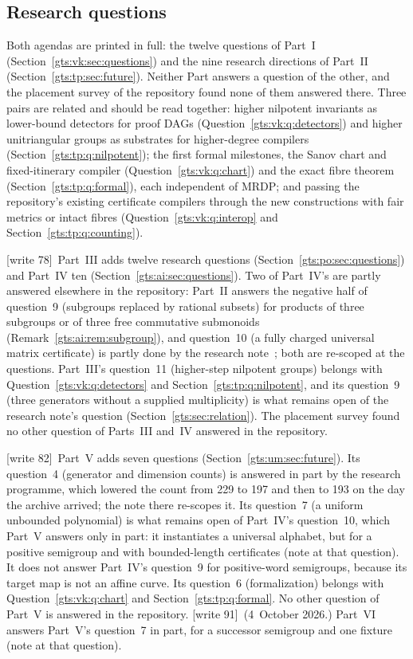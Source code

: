 \documentclass[11pt,letterpaper]{article}
\theoremstyle{definition}
\theoremstyle{remark}
\newcommand{\wtagb}{\textup{[write 78]}}
\newcommand{\wtagc}{\textup{[write 82]}}
\newcommand{\wtagd}{\textup{[write 91]}}
\begin{document}
\subsection{Research questions}\label{gts:sec:questions}

Both agendas are printed in full: the twelve questions of Part~I (Section~\ref{gts:vk:sec:questions}) and the nine research directions of Part~II (Section~\ref{gts:tp:sec:future}). Neither Part answers a question of the other, and the placement survey of the repository found none of them answered there. Three pairs are related and should be read together: higher nilpotent invariants as lower-bound detectors for proof DAGs (Question~\ref{gts:vk:q:detectors}) and higher unitriangular groups as substrates for higher-degree compilers (Section~\ref{gts:tp:q:nilpotent}); the first formal milestones, the Sanov chart and fixed-itinerary compiler (Question~\ref{gts:vk:q:chart}) and the exact fibre theorem (Section~\ref{gts:tp:q:formal}), each independent of MRDP; and passing the repository's existing certificate compilers through the new constructions with fair metrics or intact fibres (Question~\ref{gts:vk:q:interop} and Section~\ref{gts:tp:q:counting}).

\wtagb\ Part~III adds twelve research questions (Section~\ref{gts:po:sec:questions}) and Part~IV ten (Section~\ref{gts:ai:sec:questions}). Two of Part~IV's are partly answered elsewhere in the repository: Part~II answers the negative half of question~9 (subgroups replaced by rational subsets) for products of three subgroups or of three free commutative submonoids (Remark~\ref{gts:ai:rem:subgroup}), and question~10 (a fully charged universal matrix certificate) is partly done by the research note~\cite{repo-cmc}; both are re-scoped at the questions. Part~III's question~11 (higher-step nilpotent groups) belongs with Question~\ref{gts:vk:q:detectors} and Section~\ref{gts:tp:q:nilpotent}, and its question~9 (three generators without a supplied multiplicity) is what remains open of the research note's question (Section~\ref{gts:sec:relation}). The placement survey found no other question of Parts~III and~IV answered in the repository.

\wtagc\ Part~V adds seven questions (Section~\ref{gts:um:sec:future}). Its question~4 (generator and dimension counts) is answered in part by the research programme, which lowered the count from 229 to 197 and then to 193 on the day the archive arrived; the note there re-scopes it. Its question~7 (a uniform unbounded polynomial) is what remains open of Part~IV's question~10, which Part~V answers only in part: it instantiates a universal alphabet, but for a positive semigroup and with bounded-length certificates (note at that question). It does not answer Part~IV's question~9 for positive-word semigroups, because its target map is not an affine curve. Its question~6 (formalization) belongs with Question~\ref{gts:vk:q:chart} and Section~\ref{gts:tp:q:formal}. No other question of Part~V is answered in the repository. \wtagd\ (4~October 2026.) Part~VI answers Part~V's question~7 in part, for a successor semigroup and one fixture (note at that question).
\end{document}
